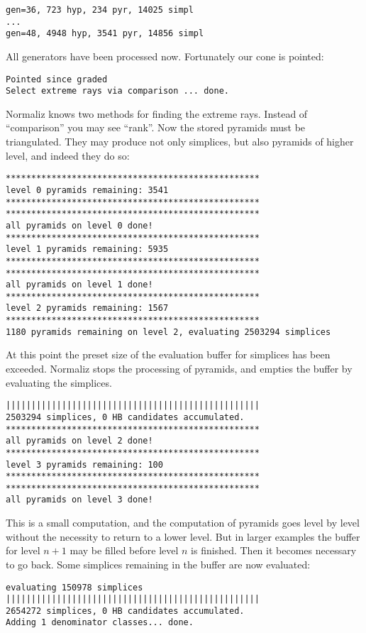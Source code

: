 \documentclass[12pt,a4paper]{scrartcl}
\theoremstyle{definition}
\begin{document}
\begin{Verbatim}
gen=36, 723 hyp, 234 pyr, 14025 simpl
...
gen=48, 4948 hyp, 3541 pyr, 14856 simpl
\end{Verbatim}
All generators have been processed now. Fortunately our cone is pointed:
\begin{Verbatim}
Pointed since graded
Select extreme rays via comparison ... done.
\end{Verbatim}
Normaliz knows two methods for finding the extreme rays. Instead of ``comparison'' you may see ``rank''.
Now the stored pyramids must be triangulated. They may produce not only simplices, but also pyramids of higher level, and indeed they do so:
\begin{Verbatim}
**************************************************
level 0 pyramids remaining: 3541
**************************************************
**************************************************
all pyramids on level 0 done!
**************************************************
level 1 pyramids remaining: 5935
**************************************************
**************************************************
all pyramids on level 1 done!
**************************************************
level 2 pyramids remaining: 1567
**************************************************
1180 pyramids remaining on level 2, evaluating 2503294 simplices
\end{Verbatim}
At this point the preset size of the evaluation buffer for simplices has been exceeded. Normaliz stops the processing of pyramids, and empties the buffer by evaluating the simplices. 
\begin{Verbatim}
||||||||||||||||||||||||||||||||||||||||||||||||||
2503294 simplices, 0 HB candidates accumulated.
**************************************************
all pyramids on level 2 done!
**************************************************
level 3 pyramids remaining: 100
**************************************************
**************************************************
all pyramids on level 3 done!
\end{Verbatim}
This is a small computation, and the computation of pyramids goes level by level without the necessity to return to a lower level. But in larger examples the buffer for level $n+1$ may be filled before level $n$ is finished. Then it becomes necessary to go back. Some simplices remaining in the buffer are now evaluated:
\begin{Verbatim}
evaluating 150978 simplices
||||||||||||||||||||||||||||||||||||||||||||||||||
2654272 simplices, 0 HB candidates accumulated.
Adding 1 denominator classes... done.
\end{Verbatim}
\end{document}

